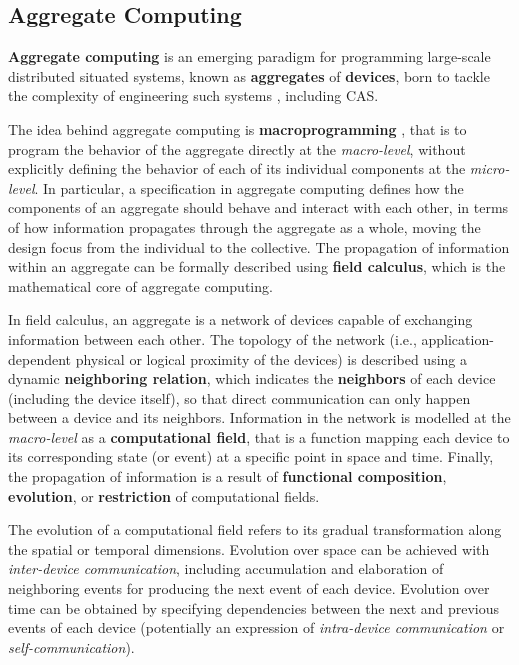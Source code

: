 
\subsection{Aggregate Computing}
\label{section:background:concepts:aggregate-computing}

\textbf{Aggregate computing} is an emerging paradigm for programming large-scale
distributed situated systems, known as \textbf{aggregates} of \textbf{devices},
born to tackle the complexity of engineering such systems
\cite{FieldCalculus-AggregateComputing}, including \ac{CAS}.

The idea behind aggregate computing is \textbf{macroprogramming}
\cite{Macroprogramming}, that is to program the behavior of the aggregate
directly at the \textit{macro-level}, without explicitly defining the behavior
of each of its individual components at the \textit{micro-level}. In
particular, a specification in aggregate computing defines how the components
of an aggregate should behave and interact with each other, in terms of how
information propagates through the aggregate as a whole, moving the design
focus from the individual to the collective. The propagation of information
within an aggregate can be formally described using \textbf{field calculus},
which is the mathematical core of aggregate computing.

In field calculus, an aggregate is a network of devices capable of exchanging
information between each other. The topology of the network (i.e.,
application-dependent physical or logical proximity of the devices) is
described using a dynamic \textbf{neighboring relation}, which indicates the
\textbf{neighbors} of each device (including the device itself), so that direct
communication can only happen between a device and its neighbors. Information
in the network is modelled at the \textit{macro-level} as a
\textbf{computational field}, that is a function mapping each device to its
corresponding state (or event) at a specific point in space and time. Finally,
the propagation of information is a result of \textbf{functional composition},
\textbf{evolution}, or \textbf{restriction} of computational fields.

The evolution of a computational field refers to its gradual transformation
along the spatial or temporal dimensions. Evolution over space can be achieved
with \textit{inter-device communication}, including accumulation and
elaboration of neighboring events for producing the next event of each device.
Evolution over time can be obtained by specifying dependencies between the next
and previous events of each device (potentially an expression of
\textit{intra-device communication} or \textit{self-communication}).

